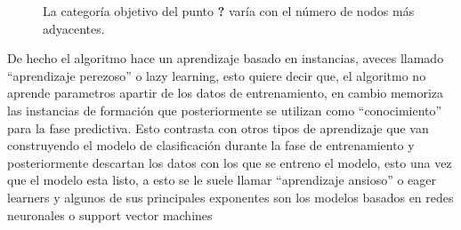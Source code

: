 \begin{figure}
	\centering
	\caption{La categoría objetivo del punto \textbf{?} varía con el número de nodos más adyacentes.}
	\label{Fig:KNNejemplo}
\end{figure}

De hecho el algoritmo hace un aprendizaje basado en instancias, aveces llamado ``aprendizaje perezoso'' o lazy learning, esto quiere decir que, el algoritmo no aprende parametros apartir de los datos de entrenamiento, en cambio memoriza las instancias de formación que posteriormente se utilizan como ``conocimiento'' para la fase predictiva. Esto contrasta con otros tipos de aprendizaje que van construyendo el modelo de clasificación durante la fase de entrenamiento y posteriormente descartan los datos con los que se entreno el modelo, esto una vez que el modelo esta listo, a esto se le suele llamar ``aprendizaje ansioso'' o eager learners y algunos de sus principales exponentes son los modelos basados en redes neuronales o support vector machines

